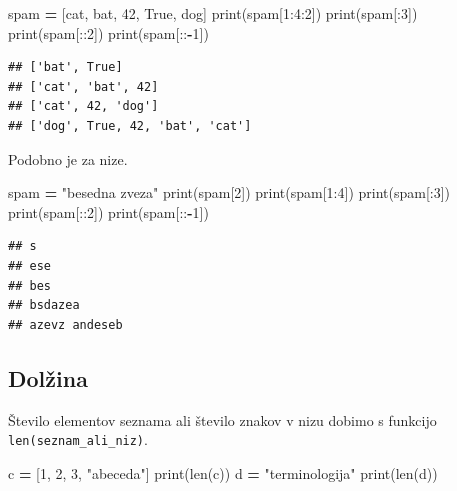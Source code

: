 \documentclass[
]{report}
\newenvironment{Shaded}{\begin{snugshade}}{\end{snugshade}}
\newcommand{\BuiltInTok}[1]{#1}
\newcommand{\DecValTok}[1]{\textcolor[rgb]{0.00,0.00,0.81}{#1}}
\newcommand{\NormalTok}[1]{#1}
\newcommand{\OperatorTok}[1]{\textcolor[rgb]{0.81,0.36,0.00}{\textbf{#1}}}
\newcommand{\StringTok}[1]{\textcolor[rgb]{0.31,0.60,0.02}{#1}}
\newcommand{\VariableTok}[1]{\textcolor[rgb]{0.00,0.00,0.00}{#1}}
\begin{document}
\begin{Shaded}
\begin{Highlighting}[]
\NormalTok{spam }\OperatorTok{=}\NormalTok{ [}\StringTok{\textquotesingle{}cat\textquotesingle{}}\NormalTok{, }\StringTok{\textquotesingle{}bat\textquotesingle{}}\NormalTok{, }\DecValTok{42}\NormalTok{, }\VariableTok{True}\NormalTok{, }\StringTok{\textquotesingle{}dog\textquotesingle{}}\NormalTok{]}
\BuiltInTok{print}\NormalTok{(spam[}\DecValTok{1}\NormalTok{:}\DecValTok{4}\NormalTok{:}\DecValTok{2}\NormalTok{])}
\BuiltInTok{print}\NormalTok{(spam[:}\DecValTok{3}\NormalTok{])}
\BuiltInTok{print}\NormalTok{(spam[::}\DecValTok{2}\NormalTok{])}
\BuiltInTok{print}\NormalTok{(spam[::}\OperatorTok{{-}}\DecValTok{1}\NormalTok{])}
\end{Highlighting}
\end{Shaded}

\begin{verbatim}
## ['bat', True]
## ['cat', 'bat', 42]
## ['cat', 42, 'dog']
## ['dog', True, 42, 'bat', 'cat']
\end{verbatim}

Podobno je za nize.

\begin{Shaded}
\begin{Highlighting}[]
\NormalTok{spam }\OperatorTok{=} \StringTok{"besedna zveza"}
\BuiltInTok{print}\NormalTok{(spam[}\DecValTok{2}\NormalTok{])}
\BuiltInTok{print}\NormalTok{(spam[}\DecValTok{1}\NormalTok{:}\DecValTok{4}\NormalTok{])}
\BuiltInTok{print}\NormalTok{(spam[:}\DecValTok{3}\NormalTok{])}
\BuiltInTok{print}\NormalTok{(spam[::}\DecValTok{2}\NormalTok{])}
\BuiltInTok{print}\NormalTok{(spam[::}\OperatorTok{{-}}\DecValTok{1}\NormalTok{])}
\end{Highlighting}
\end{Shaded}

\begin{verbatim}
## s
## ese
## bes
## bsdazea
## azevz andeseb
\end{verbatim}

\hypertarget{dolux17eina}{%
\subsection{Dolžina}\label{dolux17eina}}

Število elementov seznama ali število znakov v nizu dobimo s funkcijo \texttt{len(seznam\_ali\_niz)}.

\begin{Shaded}
\begin{Highlighting}[]
\NormalTok{c }\OperatorTok{=}\NormalTok{ [}\DecValTok{1}\NormalTok{, }\DecValTok{2}\NormalTok{, }\DecValTok{3}\NormalTok{, }\StringTok{"abeceda"}\NormalTok{]}
\BuiltInTok{print}\NormalTok{(}\BuiltInTok{len}\NormalTok{(c))}
\NormalTok{d }\OperatorTok{=} \StringTok{"terminologija"}
\BuiltInTok{print}\NormalTok{(}\BuiltInTok{len}\NormalTok{(d))}
\end{Highlighting}
\end{Shaded}
\end{document}
